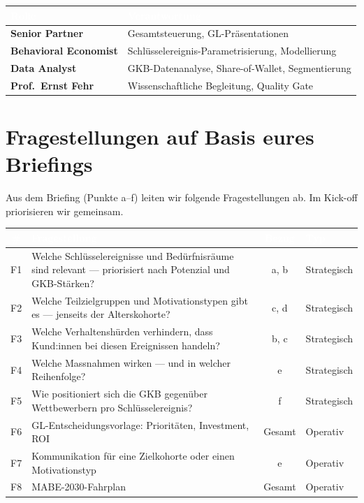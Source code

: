 \documentclass[11pt,a4paper]{article}
\newcommand{\headerrow}{\rowcolor{fadarkblue}}
\newcommand{\altrow}{\rowcolor{falightgray}}
\begin{document}
\begin{center}
\begin{tabularx}{\textwidth}{l X}
\toprule
\headerrow \textcolor{white}{\textbf{Rolle}} & \textcolor{white}{\textbf{Verantwortung}} \\
\midrule
\textbf{Senior Partner} & Gesamtsteuerung, GL-Präsentationen \\
\altrow \textbf{Behavioral Economist} & Schlüsselereignis-Parametrisierung, Modellierung \\
\textbf{Data Analyst} & GKB-Datenanalyse, Share-of-Wallet, Segmentierung \\
\altrow \textbf{Prof.\ Ernst Fehr} & Wissenschaftliche Begleitung, Quality Gate \\
\bottomrule
\end{tabularx}
\end{center}


\section{Fragestellungen auf Basis eures Briefings}

Aus dem Briefing (Punkte a--f) leiten wir folgende Fragestellungen ab. Im Kick-off priorisieren wir gemeinsam.

\begin{center}
\begin{tabularx}{\textwidth}{c X c >{\raggedright\arraybackslash}p{2cm}}
\toprule
\headerrow \textcolor{white}{\textbf{\#}} & \textcolor{white}{\textbf{Fragestellung}} & \textcolor{white}{\textbf{Bezug}} & \textcolor{white}{\textbf{Typ}} \\
\midrule
F1 & Welche Schlüsselereignisse und Bedürfnisräume sind relevant --- priorisiert nach Potenzial und GKB-Stärken? & a, b & Strategisch \\
\altrow F2 & Welche Teilzielgruppen und Motivationstypen gibt es --- jenseits der Alterskohorte? & c, d & Strategisch \\
F3 & Welche Verhaltenshürden verhindern, dass Kund:innen bei diesen Ereignissen handeln? & b, c & Strategisch \\
\altrow F4 & Welche Massnahmen wirken --- und in welcher Reihenfolge? & e & Strategisch \\
F5 & Wie positioniert sich die GKB gegenüber Wettbewerbern pro Schlüsselereignis? & f & Strategisch \\
\altrow F6 & GL-Entscheidungsvorlage: Prioritäten, Investment, ROI & Gesamt & Operativ \\
F7 & Kommunikation für eine Zielkohorte oder einen Motivationstyp & e & Operativ \\
\altrow F8 & MABE-2030-Fahrplan & Gesamt & Operativ \\
\bottomrule
\end{tabularx}
\end{center}
\end{document}
